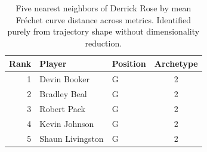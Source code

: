 \begin{table}[htbp]
  \centering\small
  \begin{tabular}{rllc}
    \toprule
    Rank & Player & Position & Archetype \\
    \midrule
    1 & Devin Booker & G & 2 \\
    2 & Bradley Beal & G & 2 \\
    3 & Robert Pack & G & 2 \\
    4 & Kevin Johnson & G & 2 \\
    5 & Shaun Livingston & G & 2 \\
    \bottomrule
  \end{tabular}
  \caption{Five nearest neighbors of Derrick Rose by mean Fr\'{e}chet curve distance across metrics. Identified purely from trajectory shape without dimensionality reduction.}
  \label{tab:Derrick_Rose_frechet_curve_neighbors}
\end{table}

